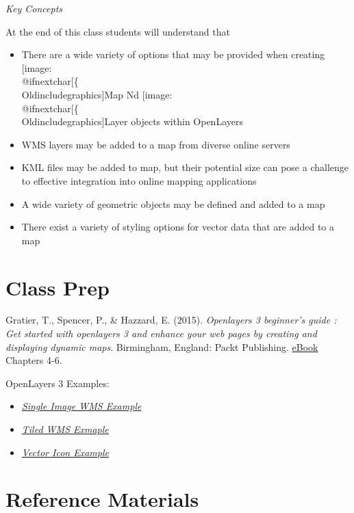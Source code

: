 \documentclass[]{book}
\makeatletter
\providecommand{\tightlist}{%
  \setlength{\itemsep}{0pt}\setlength{\parskip}{0pt}}
\def\ScaleIfNeeded{%
  \ifdim\Gin@nat@width>.5\linewidth
    .5\linewidth
  \else
    \Gin@nat@width
  \fi
}
\let\Oldincludegraphics\texttt{[image: \%
 \\catcode`\\@=11\\relax\%
 \%\\gdef\\includegraphics\{\\@ifnextchar[\{\\Oldincludegraphics]}{\Oldincludegraphics[width=\ScaleIfNeeded]}}%
\gdef\texttt{[image: \\@ifnextchar[\{\\Oldincludegraphics]}{\Oldincludegraphics[max size={.75\textwidth}{.75\textheight}]}}%
\makeatother
\begin{document}
\emph{Key Concepts }

At the end of this class students will understand that

\begin{itemize}
\tightlist
\item
  There are a wide variety of options that may be provided when creating
  \texttt{Map} Nd \texttt{Layer} objects within OpenLayers
\item
  WMS layers may be added to a map from diverse online servers
\item
  KML files may be added to map, but their potential size can pose a
  challenge to effective integration into online mapping applications
\item
  A wide variety of geometric objects may be defined and added to a map
\item
  There exist a variety of styling options for vector data that are
  added to a map
\end{itemize}

\section{Class Prep}\label{week11-prep}

Gratier, T., Spencer, P., \& Hazzard, E. (2015). \emph{Openlayers 3
beginner's guide : Get started with openlayers 3 and enhance your web
pages by creating and displaying dynamic maps}. Birmingham, England:
Packt Publishing.
\href{https://unm-on-worldcat-org.libproxy.unm.edu/oclc/903963849?databaseList=1271,143,1487,1533,1540,1672,1708,173,1925,2006,2007,203,2201,2237,2259,2260,2261,2262,2263,2264,2267,2268,2281,2328,3036,3201,638}{eBook}
Chapters 4-6.

OpenLayers 3 Examples:

\begin{itemize}
\tightlist
\item
  \href{http://openlayers.org/en/v3.2.1/examples/wms-image.html?q=wms}{\emph{Single
  Image WMS Example}}
\item
  \href{http://openlayers.org/en/v3.2.1/examples/wms-tiled.html?q=wms}{\emph{Tiled
  WMS Exmaple}}
\item
  \href{http://openlayers.org/en/v3.2.1/examples/icon.js}{\emph{Vector
  Icon Example}}
\end{itemize}

\section{Reference Materials}\label{week11-reference}
\end{document}
